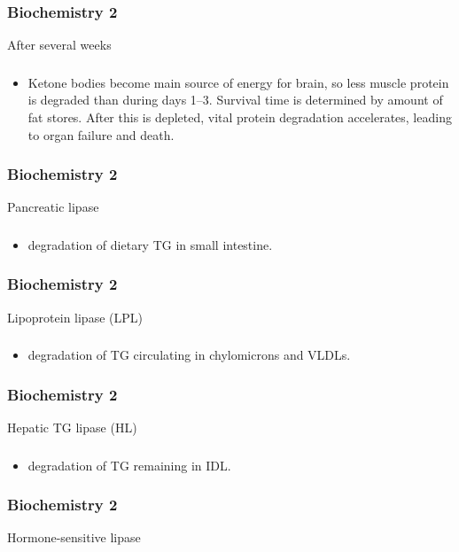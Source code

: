 \documentclass[11pt]{beamer}
\begin{document}
\begin{frame}
 \frametitle{Biochemistry 2}
After several weeks
\end{frame}

\begin{frame}
 \frametitle{}
\begin{itemize}
\item Ketone bodies become main source of energy for brain, so less muscle protein is degraded than during days 1–3. Survival time is determined by amount of fat stores. After this is depleted, vital protein degradation accelerates, leading to organ failure and death.
\end{itemize}
\end{frame}

\begin{frame}
 \frametitle{Biochemistry 2}
Pancreatic lipase
\end{frame}

\begin{frame}
 \frametitle{}
\begin{itemize}
\item degradation of dietary TG in small intestine.
\end{itemize}
\end{frame}

\begin{frame}
 \frametitle{Biochemistry 2}
Lipoprotein lipase (LPL)
\end{frame}

\begin{frame}
 \frametitle{}
\begin{itemize}
\item degradation of TG circulating in chylomicrons and VLDLs.
\end{itemize}
\end{frame}

\begin{frame}
 \frametitle{Biochemistry 2}
Hepatic TG lipase (HL)
\end{frame}

\begin{frame}
 \frametitle{}
\begin{itemize}
\item degradation of TG remaining in IDL.
\end{itemize}
\end{frame}

\begin{frame}
 \frametitle{Biochemistry 2}
Hormone-sensitive lipase
\end{frame}
\end{document}
